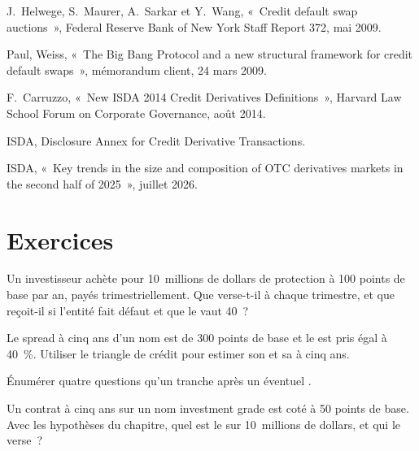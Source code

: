 \begin{omsources}
\item J.~Helwege, S.~Maurer, A.~Sarkar et Y.~Wang, «~Credit default swap auctions~»,
Federal Reserve Bank of New York Staff Report 372, mai 2009.
\item Paul, Weiss, «~The Big Bang Protocol and a new structural framework for credit
default swaps~», mémorandum client, 24 mars 2009.
\item F.~Carruzzo, «~New ISDA 2014 Credit Derivatives Definitions~», Harvard Law School
Forum on Corporate Governance, août 2014.
\item ISDA, Disclosure Annex for Credit Derivative Transactions.
\item ISDA, «~Key trends in the size and composition of OTC derivatives markets in the
second half of 2025~», juillet 2026.
\end{omsources}

\section{Exercices}

\begin{exercise}[$\star$]\label{exo:m2:credit-default-swaps:1}
Un investisseur achète pour 10~millions de dollars de protection à 100 points de base par an, payés
trimestriellement. Que verse-t-il à chaque trimestre, et que reçoit-il si l'entité
fait défaut et que le  vaut 40~?
\end{exercise}

\begin{exercise}[$\star$]\label{exo:m2:credit-default-swaps:2}
Le spread à cinq ans d'un nom est de 300 points de base et le  est pris égal à 40~\%. Utiliser
le triangle de crédit pour estimer son  et sa  à cinq ans.
\end{exercise}

\begin{exercise}[$\star$]\label{exo:m2:credit-default-swaps:3}
Énumérer quatre questions qu'un  tranche après un éventuel .
\end{exercise}

\begin{exercise}[$\star\star$]\label{exo:m2:credit-default-swaps:4}
Un contrat à cinq ans sur un nom investment grade est coté à 50 points de base. Avec les
hypothèses du chapitre, quel est le  sur 10~millions de dollars, et qui le verse~?
\end{exercise}

